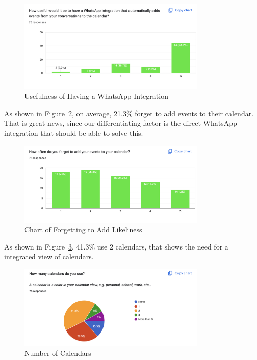 \documentclass[12pt,a4paper]{report}
\begin{document}
\begin{figure}[!h]
    \centering
    \includegraphics[width=0.8\textwidth]{images/survey/usefullness.png}
    \caption{Usefulness of Having a WhatsApp Integration}
    \label{fig:usefullness}
\end{figure}

As shown in Figure~\ref{fig:forget-to-add}, on average, 21.3\% forget to add events to their calendar. That is great news, since our differentiating factor is the direct WhatsApp integration that should be able to solve this.

\begin{figure}[!h]
    \centering
    \includegraphics[width=0.8\textwidth]{images/survey/forget-to-add.png}
    \caption{Chart of Forgetting to Add Likeliness}
    \label{fig:forget-to-add}
\end{figure}

As shown in Figure~\ref{fig:number-of-calendars}, 41.3\% use 2 calendars, that shows the need for a integrated view of calendars.

\begin{figure}[!h]
    \centering
    \includegraphics[width=0.8\textwidth]{images/survey/number-of-calendars.png}
    \caption{Number of Calendars}
    \label{fig:number-of-calendars}
\end{figure}
\end{document}
